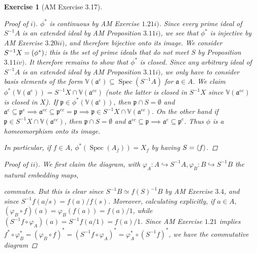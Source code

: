 \documentclass[12pt,letterpaper]{article}
\newtheorem{problem}{Exercise}[section]
\theoremstyle{definition}
\theoremstyle{remark}
\numberwithin{figure}{problem}
\numberwithin{equation}{section}
\let\Im\relax
\DeclareMathOperator{\Im}{Im}
\DeclareMathOperator{\Spec}{Spec}
\begin{document}
\begin{problem} [AM Exercise 3.17]
\begin{proof}[Proof of $i)$]
  $\phi^*$ is continuous by AM Exercise $1.21i)$. Since every prime ideal of $S^{-1}A$ is an extended ideal by AM Proposition $3.11i)$, we see that $\phi^*$ is injective by AM Exercise $3.20ii)$, and therefore bijective onto its image. We consider $S^{-1}X = \Im(\phi^*)$; this is the set of prime ideals that do not meet $S$ by Proposition $3.11iv)$. It therefore remains to show that $\phi^*$ is closed. Since any arbitrary ideal of $S^{-1}A$ is an extended ideal by AM Proposition $3.11i)$, we only have to consider basis elements of the form $\mathbb{V}(\mathfrak{a}^e) \subseteq \Spec(S^{-1}A)$ for $\mathfrak{a} \in A$. We claim $\phi^*(\mathbb{V}(\mathfrak{a}^e)) = S^{-1}X \cap \mathbb{V}(\mathfrak{a}^{ec})$ (note the latter is closed in $S^{-1}X$ since $\mathbb{V}(\mathfrak{a}^{ec})$ is closed in $X$). If $\mathfrak{p} \in \phi^*(\mathbb{V}(\mathfrak{a}^e))$, then $\mathfrak{p} \cap S = \emptyset$ and $\mathfrak{a}^e \subseteq \mathfrak{p}^e \implies \mathfrak{a}^{ec} \subseteq \mathfrak{p}^{ec} = \mathfrak{p} \implies \mathfrak{p} \in S^{-1}X \cap \mathbb{V}(\mathfrak{a}^{ec})$. On the other hand if $\mathfrak{p} \in S^{-1}X \cap \mathbb{V}(\mathfrak{a}^{ec})$, then $\mathfrak{p} \cap S = \emptyset$ and $\mathfrak{a}^{ec} \subseteq \mathfrak{p} \implies \mathfrak{a}^e \subseteq \mathfrak{p}^e$. Thus $\phi$ is a homeomorphism onto its image.
  \par In particular, if $f \in A$, $\phi^*(\Spec(A_f)) = X_f$ by having $S = \braket{f}$.
\end{proof}
\begin{proof}[Proof of $ii)$]
  We first claim the diagram, with $\varphi_A : A \hookrightarrow S^{-1}A, \varphi_B : B \hookrightarrow S^{-1}B$ the natural embedding maps,
  \begin{center}
  \end{center}
  commutes. But this is clear since $S^{-1}B \simeq f(S)^{-1}B$ by AM Exercise $3.4$, and since $S^{-1}f(a/s) = f(a)/f(s)$. Moreover, calculating explicitly, if $a \in A$, $(\varphi_B \circ f) (a) = \varphi_B (f(a)) = f(a)/1$, while $(S^{-1}f \circ \varphi_A)(a) = S^{-1}f (a/1) = f(a)/1$. Since AM Exercise $1.21$ implies $f^* \circ \varphi_B^* = (\varphi_B \circ f)^* = (S^{-1}f \circ \varphi_A)^* = \varphi_A^* \circ (S^{-1}f)^*$, we have the commutative diagram

\end{proof}
\end{problem}
\end{document}
